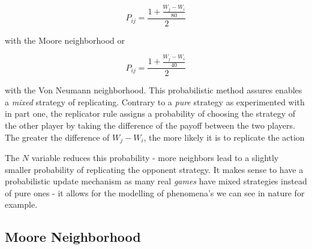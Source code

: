 \documentclass[a4paper, 11pt]{article}
\begin{document}
\[ P_{ij} = \frac{1+ \frac{W_j-W_i}{80}}{2} \]

with the Moore neighborhood or

\[ P_{ij} = \frac{1+ \frac{W_j-W_i}{40}}{2} \]

with the Von Neumann neighborhood. This probabilistic method assures enables a \textit{mixed} strategy of replicating. Contrary to a \textit{pure} strategy as experimented with in part one, the replicator rule assigns a probability of choosing the strategy of the other player by taking the difference of the payoff between the two players. The greater the difference of $W_j - W_i$, the more likely it is to replicate the action

The $N$ variable reduces this probability - more neighbors lead to a slightly smaller probability of replicating the opponent strategy. It makes sense to have a probabilistic update mechanism as many real \textit{games} have mixed strategies instead of pure ones - it allows for the modelling of phenomena’s we can see in nature for example.



\newpage

\subsection{Moore Neighborhood}
\end{document}
